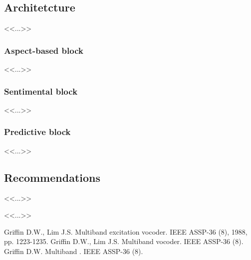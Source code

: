 \documentclass[a4paper,12pt]{extarticle}
\begin{document}
    \subsection{Architetcture}
    <<...>>

    \subsubsection{Aspect-based block}
    <<...>>

    \subsubsection{Sentimental block}
    <<...>>

    \subsubsection{Predictive block}
    <<...>>

    \subsection{Recommendations}
    <<...>>

    \newpage
    <<...>>

    \begin{thebibliography}{1}
         Griffin D.W., Lim J.S. \flqq Multiband excitation vocoder\frqq. IEEE ASSP-36 (8), 1988, pp. 1223-1235.
         Griffin D.W., Lim J.S. \flqq Multiband  vocoder\frqq. IEEE ASSP-36 (8).
         Griffin D.W. \flqq Multiband \frqq. IEEE ASSP-36 (8).
    \end{thebibliography}
\end{document}
